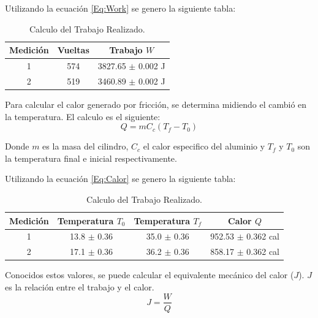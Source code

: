 \documentclass[12pt]{article}
\begin{document}
Utilizando la ecuación \eqref{Eq:Work} se genero la siguiente tabla:
	\begin{table}[H]
		\centering
		\begin{tabular}{|c|c|c|}
			\hline
			\textbf{Medición} &\textbf{Vueltas} & \textbf{Trabajo $W$} \\ \hline
			1 & 574 & 3827.65 $\pm$ 0.002 J \\ \hline
			2 & 519 & 3460.89 $\pm$ 0.002 J \\ \hline
		\end{tabular}
		\caption{Calculo del Trabajo Realizado.}
		\label{tab:WORK}
	\end{table}

Para calcular el calor generado por fricción, se determina midiendo el cambió en la temperatura. El calculo es el siguiente:
\begin{equation}
\label{Eq:Calor}
Q = mC_c(T_f-T_0)
\end{equation}

Donde $m$ es la masa del cilindro, $C_c$ el calor especifico del aluminio y $T_f$ y $T_0$ son la temperatura final e inicial respectivamente.

Utilizando la ecuación \eqref{Eq:Calor} se genero la siguiente tabla:
	\begin{table}[H]
		\centering
		\begin{tabular}{|c|c|c|c|}
			\hline
			\textbf{Medición} &\textbf{Temperatura $T_0$ } & \textbf{Temperatura $T_f$ }& \textbf{Calor $Q$} \\ \hline
			1 & 13.8 $\pm$ 0.36\celsius & 35.0 $\pm$ 0.36\celsius & 952.53 $\pm$ 0.362 cal \\ \hline
			2 & 17.1 $\pm$ 0.36\celsius & 36.2 $\pm$ 0.36\celsius & 858.17 $\pm$ 0.362 cal \\ \hline
		\end{tabular}
		\caption{Calculo del Trabajo Realizado.}
		\label{tab:Calor}
	\end{table}

Conocidos estos valores, se puede calcular el equivalente mecánico del calor ($J$). $J$ es la relación entre el trabajo y el calor.
\begin{equation}
\label{Eq:J}
J = \frac{W}{Q}
\end{equation}
\end{document}
